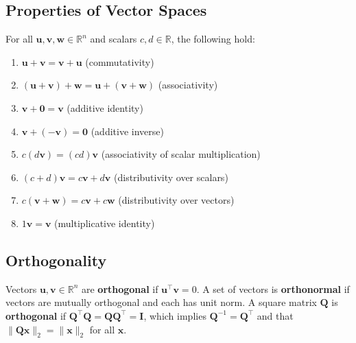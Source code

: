 \subsection{Properties of Vector Spaces}\label{sec:vector-space}
For all $ \mathbf{u}, \mathbf{v}, \mathbf{w} \in \mathbb{R}^n $ and scalars $ c, d \in \mathbb{R} $, the following hold:
\begin{enumerate}
    \item $ \mathbf{u} + \mathbf{v} = \mathbf{v} + \mathbf{u} $ (commutativity)
    \item $ (\mathbf{u} + \mathbf{v}) + \mathbf{w} = \mathbf{u} + (\mathbf{v} + \mathbf{w}) $ (associativity)
    \item $ \mathbf{v} + \mathbf{0} = \mathbf{v} $ (additive identity)
    \item $ \mathbf{v} + (-\mathbf{v}) = \mathbf{0} $ (additive inverse)
    \item $ c(d\mathbf{v}) = (cd)\mathbf{v} $ (associativity of scalar multiplication)
    \item $ (c + d)\mathbf{v} = c\mathbf{v} + d\mathbf{v} $ (distributivity over scalars)
    \item $ c(\mathbf{v} + \mathbf{w}) = c\mathbf{v} + c\mathbf{w} $ (distributivity over vectors)
    \item $ 1\mathbf{v} = \mathbf{v} $ (multiplicative identity)
\end{enumerate}

\subsection{Orthogonality}
Vectors $ \mathbf{u}, \mathbf{v} \in \mathbb{R}^n $ are \textbf{orthogonal} if $ \mathbf{u}^\top \mathbf{v} = 0 $. A set of vectors is \textbf{orthonormal} if vectors are mutually orthogonal and each has unit norm. A square matrix $ \mathbf{Q} $ is \textbf{orthogonal} if $ \mathbf{Q}^\top \mathbf{Q} = \mathbf{Q}\mathbf{Q}^\top = \mathbf{I} $, which implies $ \mathbf{Q}^{-1} = \mathbf{Q}^\top $ and that $ \|\mathbf{Q}\mathbf{x}\|_2 = \|\mathbf{x}\|_2 $ for all $ \mathbf{x} $.



